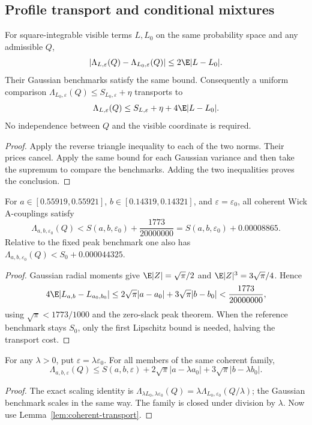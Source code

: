\subsection{Profile transport and conditional mixtures}
\begin{lemma}
\label{lem:coherent-transport}
For square-integrable visible terms $L,L_0$ on the same probability
space and any admissible $Q$,
\[
 |\Lambda_{L,\varepsilon}(Q)-\Lambda_{L_0,\varepsilon}(Q)|
 \le2\E|L-L_0|.
\]
Their Gaussian benchmarks satisfy the same bound. Consequently a
uniform comparison $\Lambda_{L_0,\varepsilon}(Q)\le S_{L_0,\varepsilon}+\eta$
transports to
\[
 \Lambda_{L,\varepsilon}(Q)\le S_{L,\varepsilon}
                         +\eta+4\E|L-L_0|.
\]
No independence between $Q$ and the visible coordinate is required.
\end{lemma}
\begin{proof}
Apply the reverse triangle inequality to each of the two norms. Their
prices cancel. Apply the same bound for each Gaussian variance and
then take the supremum to compare the benchmarks. Adding the two
inequalities proves the conclusion.
\end{proof}

\begin{corollary}
\label{cor:coherent-profile}
For $a\in[0.55919,0.55921]$, $b\in[0.14319,0.14321]$, and
$\varepsilon=\varepsilon_0$, all coherent Wick A-couplings satisfy
\[
 \boxed{\Lambda_{a,b,\varepsilon_0}(Q)
       < S(a,b,\varepsilon_0)+\frac{1773}{20000000}
       =S(a,b,\varepsilon_0)+0.00008865.}
\]
Relative to the fixed peak benchmark one also has
$\Lambda_{a,b,\varepsilon_0}(Q)<S_0+0.000044325$.
\end{corollary}
\begin{proof}
Gaussian radial moments give $\E|Z|=\sqrt\pi/2$ and
$\E|Z|^3=3\sqrt\pi/4$. Hence
\[
 4\E|L_{a,b}-L_{a_0,b_0}|
 \le2\sqrt\pi|a-a_0|+3\sqrt\pi|b-b_0|
 <\frac{1773}{20000000},
\]
using $\sqrt\pi<1773/1000$ and the zero-slack peak theorem.
When the reference benchmark stays $S_0$, only the first Lipschitz
bound is needed, halving the transport cost.
\end{proof}

\begin{corollary}
For any $\lambda>0$, put $\varepsilon=\lambda\varepsilon_0$.
For all members of the same coherent family,
\[
 \Lambda_{a,b,\varepsilon}(Q)
 \le S(a,b,\varepsilon)
     +2\sqrt\pi|a-\lambda a_0|+3\sqrt\pi|b-\lambda b_0|.
\]
\end{corollary}
\begin{proof}
The exact scaling identity is
$\Lambda_{\lambda L_0,\lambda\varepsilon_0}(Q)
=\lambda\Lambda_{L_0,\varepsilon_0}(Q/\lambda)$; the Gaussian
benchmark scales in the same way. The family is closed under division
by $\lambda$. Now use Lemma~\ref{lem:coherent-transport}.
\end{proof}

